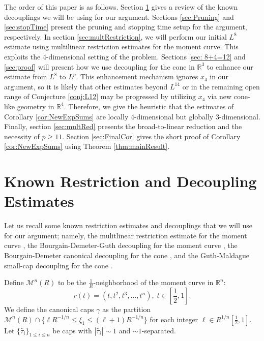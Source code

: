 \documentclass[12pt]{amsart}
\providecommand{\R}{\mathbb R}
\providecommand{\M}{\mathcal{M}}
\begin{document}
The order of this paper is as follows. Section \ref{sec:oldDecouplings} gives a review of the known decouplings we will be using for our argument. Sections \ref{sec:Pruning} and \ref{sec:stopTime} present the pruning and stopping time setup for the argument, respectively. In section \ref{sec:multRestriction}, we will perform our initial $L^8$ estimate using multilinear restriction estimates for the moment curve. This exploits the 4-dimensional setting of the problem. Sections \ref{sec: 8+4=12} and \ref{sec:proof} will present how we use decoupling for the cone in $\R^3$ to enhance our estimate from $L^8$ to $L^p$. This enhancement mechanism ignores $x_4$ in our argument, so it is likely that other estimates beyond $L^{14}$ or in the remaining open range of Conjecture \ref{conj:L12} may be progressed by utilizing $x_4$ via new cone-like geometry in $\R^4$. Therefore, we give the heuristic that the estimates of Corollary \ref{cor:NewExpSums} are locally 4-dimensional but globally 3-dimensional. Finally, section \ref{sec:multRed} presents the broad-to-linear reduction and the necessity of $p\ge 11$. Section \ref{sec:FinalCor} gives the short proof of Corollary \ref{cor:NewExpSums} using Theorem \ref{thm:mainResult}.



\section{Known Restriction and Decoupling Estimates}\label{sec:oldDecouplings}

Let us recall some known restriction estimates and decouplings that we will use for our argument; namely, the mulitlinear restriction estimate for the moment curve \cite[Ex. 6.33]{demeter2020fourier}, the Bourgain-Demeter-Guth decoupling for the moment curve \cite{bourgain2016proofmainconjecturevinogradovs}, the Bourgain-Demeter canonical decoupling for the cone \cite{demeterCanonicalDecoupling2015}, and the Guth-Maldague small-cap decoupling for the cone \cite{maldague2022amplitudedependentwaveenvelope}.

Define $\M^n(R)$ to be the $\frac{1}{R}$-neighborhood of the moment curve in $\R^n$: $$r(t)=(t, t^2, t^3, \ldots, t^n), \; t\in [\frac{1}{2}, 1].$$ We define the canonical caps $\gamma$ as the partition $\M^n(R)\cap \{\ell R^{-1/n}\le \xi_1\le (\ell+1)R^{-1/n}\}$ for each integer $\ell\in R^{1/n}[\frac{1}{2}, 1]$. Let $\{\tilde{\tau_{i}}\}_{1\le i\le n}$ be caps with $|\tilde{\tau_i}|\sim 1$ and $\sim 1$-separated. 
\end{document}
